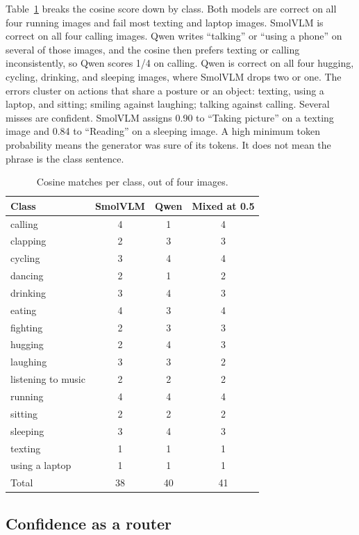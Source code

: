Table~\ref{tab:class} breaks the cosine score down by class. Both models
are correct on all four running images and fail most texting and
laptop images. SmolVLM is correct on all four calling images. Qwen writes
``talking'' or ``using a phone'' on several of those images, and the cosine
then prefers texting or calling inconsistently, so Qwen scores 1/4 on
calling. Qwen is correct on all four hugging, cycling, drinking, and
sleeping images, where SmolVLM drops two or one. The errors cluster on
actions that share a posture or an object: texting, using a laptop, and
sitting; smiling against laughing; talking against calling. Several misses
are confident. SmolVLM assigns 0.90 to ``Taking picture'' on a texting
image and 0.84 to ``Reading'' on a sleeping image. A high minimum token
probability means the generator was sure of its tokens. It does not mean
the phrase is the class sentence.

\begin{table}[t]
\caption{Cosine matches per class, out of four images.}
\label{tab:class}
\centering
\footnotesize
\begin{tabular}{lccc}
\toprule
Class & SmolVLM & Qwen & Mixed at 0.5 \\
\midrule
calling & 4 & 1 & 4 \\
clapping & 2 & 3 & 3 \\
cycling & 3 & 4 & 4 \\
dancing & 2 & 1 & 2 \\
drinking & 3 & 4 & 3 \\
eating & 4 & 3 & 4 \\
fighting & 2 & 3 & 3 \\
hugging & 2 & 4 & 3 \\
laughing & 3 & 3 & 2 \\
listening to music & 2 & 2 & 2 \\
running & 4 & 4 & 4 \\
sitting & 2 & 2 & 2 \\
sleeping & 3 & 4 & 3 \\
texting & 1 & 1 & 1 \\
using a laptop & 1 & 1 & 1 \\
\midrule
Total & 38 & 40 & 41 \\
\bottomrule
\end{tabular}
\end{table}

\subsection{Confidence as a router}

